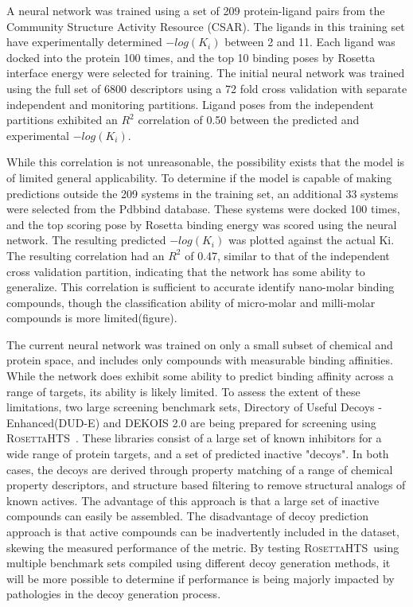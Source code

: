 \documentclass[11pt, oneside]{article}   	%
\newcommand{\rhts}{\textsc{RosettaHTS}\ }
\begin{document}
A neural network was trained using a set of 209 protein-ligand pairs from the Community Structure Activity Resource (CSAR)\citep{Smith:2011gb}.  
The ligands in this training set have experimentally determined $-log(K_{i})$ between 2 and 11.  
Each ligand was docked into the protein 100 times, and the top 10 binding poses by Rosetta interface energy were selected for training. 
The initial neural network was trained using the full set of 6800 descriptors using a 72 fold cross validation with separate independent and monitoring partitions.  
Ligand poses from the independent partitions exhibited an $R^{2}$ correlation of 0.50 between the predicted and experimental $-log(K_{i})$.

While this correlation is not unreasonable, the possibility exists that the model is of limited general applicability.  
To determine if the model is capable of making predictions outside the 209 systems in the training set, an additional 33 systems were selected from the Pdbbind database.  
These systems were docked 100 times, and the top scoring pose by Rosetta binding energy was scored using the neural network.
The resulting predicted $-log(K_{i})$ was plotted against the actual Ki.
The resulting correlation had an $R^{2}$ of 0.47, similar to that of the independent cross validation partition, indicating that the network has some ability to generalize.
This correlation is sufficient to accurate identify nano-molar binding compounds, though the classification ability of micro-molar and milli-molar compounds is more limited(figure).

The current neural network was trained on only a small subset of chemical and protein space, and includes only compounds with measurable binding affinities.  
While the network does exhibit some ability to predict binding affinity across a range of targets, its ability is likely limited. 
To assess the extent of these limitations, two large screening benchmark sets, Directory of Useful Decoys - Enhanced(DUD-E)\citep{Mysinger:2012hu} and DEKOIS 2.0\citep{Bauer:2013de} are being prepared for screening using \rhts.
These libraries consist of a large set of known inhibitors for a wide range of protein targets, and a set of predicted inactive "decoys".  
In both cases, the decoys are derived through property matching of a range of chemical property descriptors, and structure based filtering to remove structural analogs of known actives.   
The advantage of this approach is that a large set of inactive compounds can easily be assembled.
The disadvantage of decoy prediction approach is that active compounds can be inadvertently included in the dataset, skewing the measured performance of the metric.
By testing \rhts using multiple benchmark sets compiled using different decoy generation methods, it will be more possible to determine if performance is being majorly impacted by pathologies in the decoy generation process. 
\end{document}
